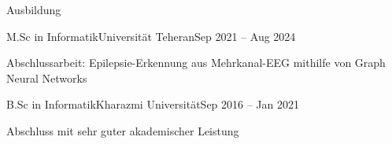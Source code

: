 \documentclass[]{main}
\begin{document}
\begin{section}{Ausbildung}
 \begin{subsectionnobullet}{M.Sc in Informatik}{Universität Teheran}{Sep 2021 -- Aug 2024}{}
     \item Abschlussarbeit: Epilepsie-Erkennung aus Mehrkanal-EEG mithilfe von Graph Neural Networks
 \end{subsectionnobullet}
 \begin{subsectionnobullet}{B.Sc in Informatik}{Kharazmi Universität}{Sep 2016 -- Jan 2021}{}
     \item Abschluss mit sehr guter akademischer Leistung
 \end{subsectionnobullet}
\end{section}

\end{document}
